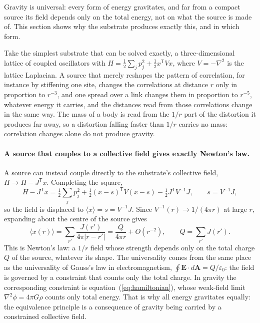 \documentclass[aps,prd,onecolumn,nofootinbib,superscriptaddress]{revtex4-2}
\begin{document}
Gravity is universal: every form of energy gravitates, and far from a compact source its field depends only on the total energy, not on what the source is made of. This section shows why the substrate produces exactly this, and in which form.

Take the simplest substrate that can be solved exactly, a three-dimensional lattice of coupled oscillators with $H = \tfrac12\sum_j p_j^2 + \tfrac12 x^{\mathsf T}Vx$, where $V = -\nabla^2$ is the lattice Laplacian. A source that merely reshapes the pattern of correlation, for instance by stiffening one site, changes the correlations at distance $r$ only in proportion to $r^{-3}$, and one spread over a link changes them in proportion to $r^{-5}$, whatever energy it carries, and the distances read from those correlations change in the same way. The mass of a body is read from the $1/r$ part of the distortion it produces far away, so a distortion falling faster than $1/r$ carries no mass: correlation changes alone do not produce gravity.

\paragraph{A source that couples to a collective field gives exactly Newton's law.} A source can instead couple directly to the substrate's collective field, $H \to H - J^{\mathsf T}x$. Completing the square,
\begin{equation}
H - J^{\mathsf T}x = \tfrac12\sum_j p_j^2 + \tfrac12(x - s)^{\mathsf T}V(x-s) - \tfrac12 J^{\mathsf T}V^{-1}J, \qquad s = V^{-1}J,
\end{equation}
so the field is displaced to $\langle x\rangle = s = V^{-1}J$. Since $V^{-1}(r) \to 1/(4\pi r)$ at large $r$, expanding about the centre of the source gives
\begin{equation}
\langle x(r)\rangle = \sum_{r'} \frac{J(r')}{4\pi|r - r'|} = \frac{Q}{4\pi r} + O(r^{-2}), \qquad Q = \sum_{r'}J(r').
\end{equation}
This is Newton's law: a $1/r$ field whose strength depends only on the total charge $Q$ of the source, whatever its shape. The universality comes from the same place as the universality of Gauss's law in electromagnetism, $\oint \mathbf{E}\cdot d\mathbf{A} = Q/\varepsilon_0$: the field is governed by a constraint that counts only the total charge. In gravity the corresponding constraint is equation~(\ref{eq:hamiltonian}), whose weak-field limit $\nabla^2\phi = 4\pi G\rho$ counts only total energy. That is why all energy gravitates equally: the equivalence principle is a consequence of gravity being carried by a constrained collective field.
\end{document}
